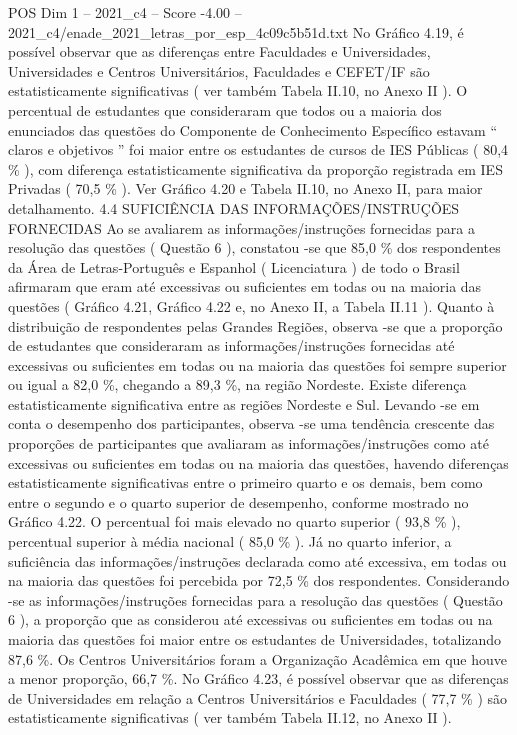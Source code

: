 \begin{textsample}{POS Dim 1 – 2021\_c4 – Score -4.00 – 2021\_c4/enade\_2021\_letras\_por\_esp\_4c09c5b51d.txt}
No Gráfico 4.19, é possível observar que as diferenças entre Faculdades e Universidades, Universidades e Centros Universitários, Faculdades e CEFET/IF são estatisticamente significativas ( ver também Tabela II.10, no Anexo II ).
O percentual de estudantes que consideraram que todos ou a maioria dos enunciados das questões do Componente de Conhecimento Específico estavam “ claros e objetivos ” foi maior entre os estudantes de cursos de IES Públicas ( 80,4 \% ), com diferença estatisticamente significativa da proporção registrada em IES Privadas ( 70,5 \% ).
Ver Gráfico 4.20 e Tabela II.10, no Anexo II, para maior detalhamento. 4.4 SUFICIÊNCIA DAS INFORMAÇÕES/INSTRUÇÕES FORNECIDAS Ao se avaliarem as informações/instruções fornecidas para a resolução das questões ( Questão 6 ), constatou -se que 85,0 \% dos respondentes da Área de Letras-Português e Espanhol ( Licenciatura ) de todo o Brasil afirmaram que eram até excessivas ou suficientes em todas ou na maioria das questões ( Gráfico 4.21, Gráfico 4.22 e, no Anexo II, a Tabela II.11 ).
Quanto à distribuição de respondentes pelas Grandes Regiões, observa -se que a proporção de estudantes que consideraram as informações/instruções fornecidas até excessivas ou suficientes em todas ou na maioria das questões foi sempre superior ou igual a 82,0 \%, chegando a 89,3 \%, na região Nordeste.
Existe diferença estatisticamente significativa entre as regiões Nordeste e Sul.
Levando -se em conta o desempenho dos participantes, observa -se uma tendência crescente das proporções de participantes que avaliaram as informações/instruções como até excessivas ou suficientes em todas ou na maioria das questões, havendo diferenças estatisticamente significativas entre o primeiro quarto e os demais, bem como entre o segundo e o quarto superior de desempenho, conforme mostrado no Gráfico 4.22.
O percentual foi mais elevado no quarto superior ( 93,8 \% ), percentual superior à média nacional ( 85,0 \% ).
Já no quarto inferior, a suficiência das informações/instruções declarada como até excessiva, em todas ou na maioria das questões foi percebida por 72,5 \% dos respondentes.
Considerando -se as informações/instruções fornecidas para a resolução das questões ( Questão 6 ), a proporção que as considerou até excessivas ou suficientes em todas ou na maioria das questões foi maior entre os estudantes de Universidades, totalizando 87,6 \%.
Os Centros Universitários foram a Organização Acadêmica em que houve a menor proporção, 66,7 \%.
No Gráfico 4.23, é possível observar que as diferenças de Universidades em relação a Centros Universitários e Faculdades ( 77,7 \% ) são estatisticamente significativas ( ver também Tabela II.12, no Anexo II ).

\end{textsample}
